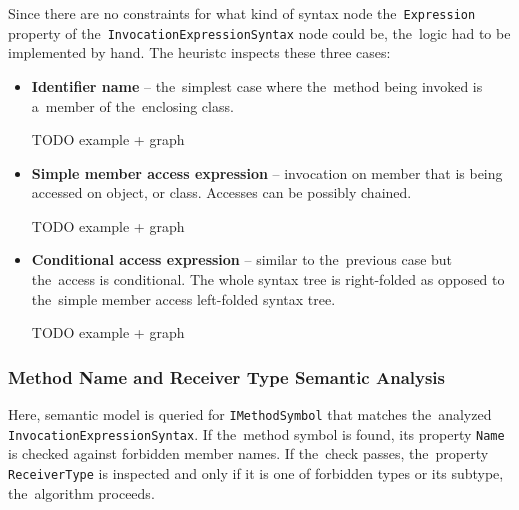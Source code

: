 \documentclass[
  digital, %
  table,   %
  lof,     %
  lot,     %
  oneside,
]{fithesis3}
\begin{document}
Since there are no constraints for what kind of syntax node the~\texttt{Expression} property of the~\texttt{InvocationExpressionSyntax} node could be, the~logic had to be implemented by hand. The heuristc inspects these three cases:
\begin{itemize}
  \item \textbf{Identifier name} -- the~simplest case where the~method being invoked is a~member of the~enclosing class.

  TODO example + graph
  
  \item \textbf{Simple member access expression} -- invocation on member that is being accessed on object, or class. Accesses can be possibly chained.
  
  TODO example + graph 
    
  \item \textbf{Conditional access expression} -- similar to the~previous case but the~access is conditional. The whole syntax tree is right-folded as opposed to the~simple member access left-folded syntax tree.
  
  TODO example + graph
  
\end{itemize} 


\subsubsection{Method Name and Receiver Type Semantic Analysis}
Here, semantic model is queried for \texttt{IMethodSymbol} that matches the~analyzed \texttt{InvocationExpressionSyntax}. If the~method symbol is found, its property \texttt{Name} is checked against forbidden member names. If the~check passes, the~property \texttt{ReceiverType} is inspected and only if it is one of forbidden types or its subtype, the~algorithm proceeds. 
\end{document}
